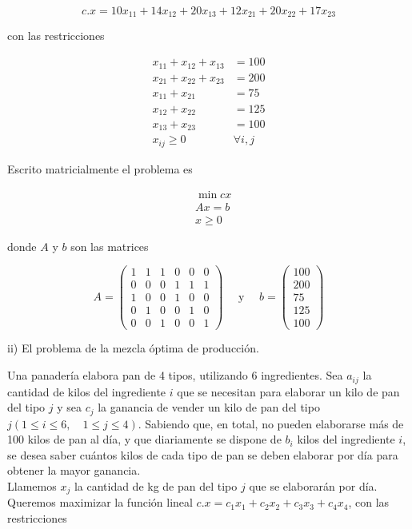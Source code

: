 \documentclass[10pt]{article}
\begin{document}
$$
c . x=10 x_{11}+14 x_{12}+20 x_{13}+12 x_{21}+20 x_{22}+17 x_{23}
$$

con las restricciones

$$
\begin{aligned}
x_{11}+x_{12}+x_{13} & =100 \\
x_{21}+x_{22}+x_{23} & =200 \\
x_{11}+x_{21} & =75 \\
x_{12}+x_{22} & =125 \\
x_{13}+x_{23} & =100 \\
x_{i j} \geq 0 & \forall i, j
\end{aligned}
$$

Escrito matricialmente el problema es

$$
\begin{aligned}
& \min c x \\
& A x=b \\
& x \geq 0
\end{aligned}
$$

donde $A$ y $b$ son las matrices

$$
A=\left(\begin{array}{cccccc}
1 & 1 & 1 & 0 & 0 & 0 \\
0 & 0 & 0 & 1 & 1 & 1 \\
1 & 0 & 0 & 1 & 0 & 0 \\
0 & 1 & 0 & 0 & 1 & 0 \\
0 & 0 & 1 & 0 & 0 & 1
\end{array}\right) \quad \text { y } \quad b=\left(\begin{array}{c}
100 \\
200 \\
75 \\
125 \\
100
\end{array}\right)
$$

ii) El problema de la mezcla óptima de producción.

Una panadería elabora pan de 4 tipos, utilizando 6 ingredientes. Sea $a_{i j}$ la cantidad de kilos del ingrediente $i$ que se necesitan para elaborar un kilo de pan del tipo $j$ y sea $c_{j}$ la ganancia de vender un kilo de pan del tipo $j(1 \leq i \leq 6, \quad 1 \leq j \leq 4)$. Sabiendo que, en total, no pueden elaborarse más de 100 kilos de pan al día, y que diariamente se dispone de $b_{i}$ kilos del ingrediente $i$, se desea saber cuántos kilos de cada tipo de pan se deben elaborar por día para obtener la mayor ganancia.\\
Llamemos $x_{j}$ la cantidad de kg de pan del tipo $j$ que se elaborarán por día. Queremos maximizar la función lineal $c . x=c_{1} x_{1}+c_{2} x_{2}+c_{3} x_{3}+c_{4} x_{4}$, con las restricciones
\end{document}
